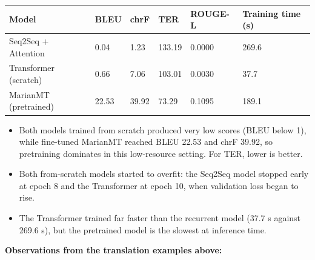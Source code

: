 \documentclass[12pt,a4paper,oneside]{report}
\providecommand{\tightlist}{\setlength{\itemsep}{0pt}\setlength{\parskip}{0pt}}
\begin{document}
\begin{longtable}[]{@{}llllll@{}}
\toprule\noalign{}
Model & BLEU & chrF & TER & ROUGE-L & Training time (s) \\
\midrule\noalign{}
\endhead
\bottomrule\noalign{}
\endlastfoot
Seq2Seq + Attention & 0.04 & 1.23 & 133.19 & 0.0000 & 269.6 \\
Transformer (scratch) & 0.66 & 7.06 & 103.01 & 0.0030 & 37.7 \\
MarianMT (pretrained) & 22.53 & 39.92 & 73.29 & 0.1095 & 189.1 \\
\end{longtable}

\begin{itemize}
\tightlist
\item
  Both models trained from scratch produced very low scores (BLEU below 1), while fine-tuned MarianMT reached BLEU 22.53 and chrF 39.92, so pretraining dominates in this low-resource setting. For TER, lower is better.
\item
  Both from-scratch models started to overfit: the Seq2Seq model stopped early at epoch 8 and the Transformer at epoch 10, when validation loss began to rise.
\item
  The Transformer trained far faster than the recurrent model (37.7 s against 269.6 s), but the pretrained model is the slowest at inference time.
\end{itemize}

\textbf{Observations from the translation examples above:}
\end{document}
